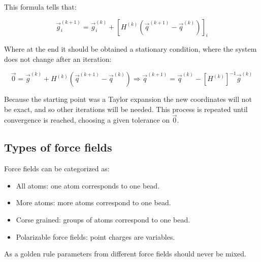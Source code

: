 		This formula tells that:

		$$\vec{g}_i^{(k+1)} = \vec{g}_i^{(k)} + [H^{(k)}(\vec{q}^{(k+1)}-\vec{q}^{(k)})]_i$$

		Where at the end it should be obtained a stationary condition, where the system does not change after an iteration:

		$$\vec{0} = \vec{g}^{(k)} + H^{(k)}(\vec{q}^{(k+1)}-\vec{q}^{(k)})\Rightarrow \vec{q}^{(k+1)} = \vec{q}^{(k)} - [H^{(k)}]^{-1}\vec{g}^{(k)}$$

		Because the starting point was a Taylor expansion the new coordinates will not be exact, and so other iterations will be needed.
		This process is repeated until convergence is reached, choosing a given tolerance on $\vec{0}$.

	\subsection{Types of force fields}
	Force fields can be categorized as:

	\begin{multicols}{2}
		\begin{itemize}
			\item All atoms: one atom corresponds to one bead.
			\item More atoms: more atoms correspond to one bead.
			\item Corse grained: groups of atoms correspond to one bead.
			\item Polarizable force fields: point charges are variables.
		\end{itemize}
	\end{multicols}

	As a golden rule parameters from different force fields should never be mixed.
